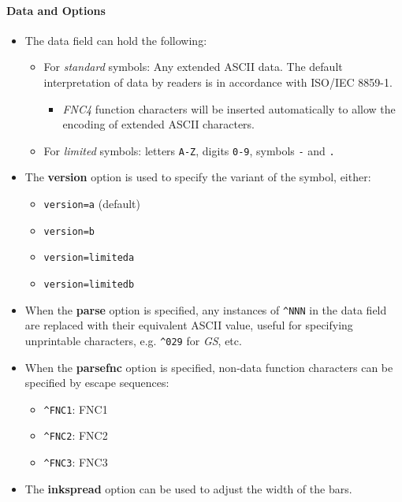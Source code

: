 \hypertarget{data-and-options-76}{%
\paragraph{Data and Options}\label{data-and-options-76}}

\begin{itemize}
\tightlist
\item
  The data field can hold the following:

  \begin{itemize}
  \tightlist
  \item
    For \emph{standard} symbols: Any extended ASCII data. The default
    interpretation of data by readers is in accordance with ISO/IEC
    8859-1.

    \begin{itemize}
    \tightlist
    \item
      \emph{FNC4} function characters will be inserted automatically to
      allow the encoding of extended ASCII characters.
    \end{itemize}
  \item
    For \emph{limited} symbols: letters \texttt{A-Z}, digits
    \texttt{0-9}, symbols \texttt{-} and \texttt{.}
  \end{itemize}
\item
  The \textbf{version} option is used to specify the variant of the
  symbol, either:

  \begin{itemize}
  \tightlist
  \item
    \texttt{version=a} (default)
  \item
    \texttt{version=b}
  \item
    \texttt{version=limiteda}
  \item
    \texttt{version=limitedb}
  \end{itemize}
\item
  When the \textbf{parse} option is specified, any instances of
  \texttt{\^{}NNN} in the data field are replaced with their equivalent
  ASCII value, useful for specifying unprintable characters, e.g.
  \texttt{\^{}029} for \emph{GS}, etc.
\item
  When the \textbf{parsefnc} option is specified, non-data function
  characters can be specified by escape sequences:

  \begin{itemize}
  \tightlist
  \item
    \texttt{\^{}FNC1}: FNC1
  \item
    \texttt{\^{}FNC2}: FNC2
  \item
    \texttt{\^{}FNC3}: FNC3
  \end{itemize}
\item
  The \textbf{inkspread} option can be used to adjust the width of the
  bars.
\end{itemize}

